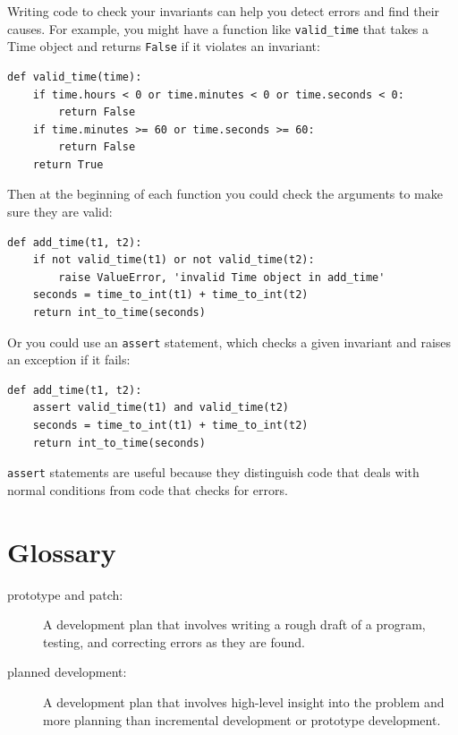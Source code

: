 \documentclass[10pt]{book}
\begin{document}
{Writing code to check your invariants can help you detect errors
and find their causes.  For example, you might have a function
like \verb"valid_time" that takes a Time object and returns
{\tt False} if it violates an invariant:

\beforeverb
\begin{verbatim}
def valid_time(time):
    if time.hours < 0 or time.minutes < 0 or time.seconds < 0:
        return False
    if time.minutes >= 60 or time.seconds >= 60:
        return False
    return True
\end{verbatim}
\afterverb
%
Then at the beginning of each function you could check the
arguments to make sure they are valid:


\beforeverb
\begin{verbatim}
def add_time(t1, t2):
    if not valid_time(t1) or not valid_time(t2):
        raise ValueError, 'invalid Time object in add_time'
    seconds = time_to_int(t1) + time_to_int(t2)
    return int_to_time(seconds)
\end{verbatim}
\afterverb
%
Or you could use an {\tt assert} statement, which checks a given invariant
and raises an exception if it fails:


\beforeverb
\begin{verbatim}
def add_time(t1, t2):
    assert valid_time(t1) and valid_time(t2)
    seconds = time_to_int(t1) + time_to_int(t2)
    return int_to_time(seconds)
\end{verbatim}
\afterverb
%
{\tt assert} statements are useful because they distinguish
code that deals with normal conditions from code
that checks for errors.


\section{Glossary}

\begin{description}

\item[prototype and patch:] A development plan that involves
writing a rough draft of a program, testing, and correcting errors as
they are found.

\item[planned development:] A development plan that involves
high-level insight into the problem and more planning than incremental
development or prototype development.


\end{description}}
\end{document}
